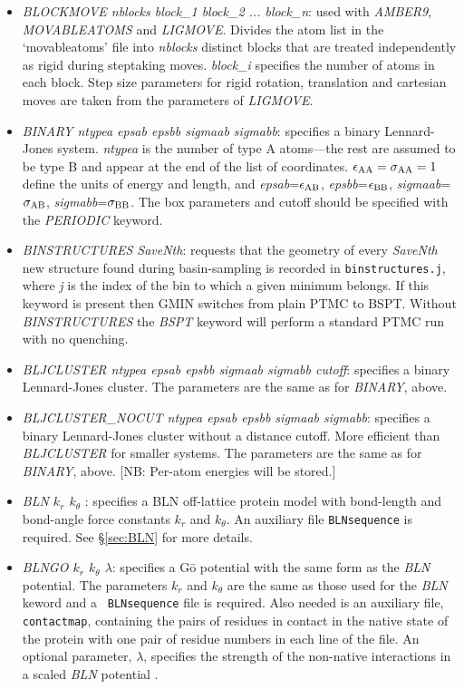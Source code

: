 \documentclass[12pt,a4paper,dvips]{article}
\begin{document}
\begin{itemize}
\item {\it BLOCKMOVE nblocks block\_1 block\_2 ... block\_n}: used with {\it AMBER9\/}, {\it MOVABLEATOMS} and {\it LIGMOVE}. 
Divides the atom list in the \lq movableatoms' file into {\it nblocks} distinct blocks that are treated independently as 
rigid during steptaking moves. {\it block\_i} specifies the number of atoms in each block. Step size parameters for rigid 
rotation, translation and cartesian moves are taken from the parameters of {\it LIGMOVE}.

\item {\it BINARY ntypea epsab epsbb sigmaab sigmabb\/}: specifies a binary Lennard-Jones
system. {\it ntypea\/} is the number of type
A atoms---the rest are assumed to be type B and appear at the end of the list
of coordinates. $\epsilon_{\rm AA}=\sigma_{\rm AA}=1$ define the units of energy and length,
and {\it epsab\/}=$\epsilon_{\rm AB}$, {\it epsbb\/}=$\epsilon_{\rm BB}$,
{\it sigmaab\/}=$\sigma_{\rm AB}$, {\it sigmabb\/}=$\sigma_{\rm BB}$.
The box parameters and cutoff should be specified with the {\it PERIODIC\/} keyword.

\item {\it BINSTRUCTURES SaveNth}: requests that the geometry of every {\it SaveNth} 
new structure found during basin-sampling is
recorded in {\tt binstructures.j}, where {\it j} is the index of the bin
to which a given minimum belongs. If this keyword is
present then GMIN switches from plain PTMC to BSPT.  
Without {\it BINSTRUCTURES} the {\it BSPT} keyword will perform a
standard PTMC run with no quenching. 

\item {\it BLJCLUSTER ntypea epsab epsbb sigmaab sigmabb cutoff\/}: specifies a binary Lennard-Jones
cluster. The parameters are the same as for {\it BINARY\/}, above.

\item {\it BLJCLUSTER\_NOCUT ntypea epsab epsbb sigmaab sigmabb\/}: specifies a binary Lennard-Jones
cluster without a distance cutoff. More efficient than {\it BLJCLUSTER\/} for smaller systems.
The parameters are the same as for {\it BINARY\/}, above.
[NB: Per-atom energies will be stored.]

\item {\it BLN $k_r$ $k_\theta$ \/}: specifies a BLN off-lattice protein model with
bond-length and bond-angle force constants $k_r$ and $k_\theta$.
An auxiliary file {\tt BLNsequence} is required.
See \S \ref{sec:BLN} for more details.

\item {\it BLNGO $k_r$ $k_\theta$ $\lambda$}: specifies a G\=o potential
with the same form as the {\it BLN} potential. The parameters $k_r$
and $k_\theta$ are the same as those used for the {\it BLN} keword and a {\tt
BLNsequence} file is required. Also needed is an auxiliary file, {\tt
contactmap}, containing the pairs of residues in contact in the native state of the protein
with one pair of residue numbers in each line of the file. An optional
parameter, $\lambda$, specifies the strength of the non-native interactions in a
scaled {\it BLN} potential \cite{KimKS09}.


\end{itemize}
\end{document}
